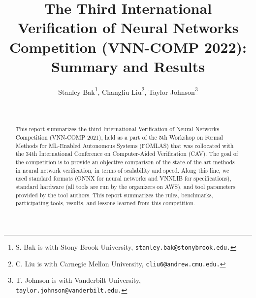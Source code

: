 \documentclass{easychair}
\title{The Third International Verification of Neural Networks Competition (VNN-COMP 2022): Summary and Results%
}
\author{Stanley Bak\thanks{S. Bak is with Stony Brook University, \tt stanley.bak@stonybrook.edu.}, Changliu Liu\thanks{C. Liu is with Carnegie Mellon University, \tt cliu6@andrew.cmu.edu.}, Taylor Johnson\thanks{T. Johnson is with Vanderbilt University, \tt taylor.johnson@vanderbilt.edu.}
}
\institute{
 }
\date{\phantom{date}\\}
\begin{document}
\maketitle

\begin{abstract}
This report summarizes the third International Verification of Neural Networks Competition (VNN-COMP 2021), held as a part of the 5th Workshop on Formal Methods for ML-Enabled Autonomous Systems (FOMLAS) that was collocated with the 34th International Conference on Computer-Aided Verification (CAV).
%
%
The goal of the competition is to provide an objective comparison of the state-of-the-art methods in neural network verification, in terms of scalability and speed.
%
Along this line, we used standard formats (ONNX for neural networks and VNNLIB for specifications), standard hardware (all tools are run by the organizers on AWS), and tool parameters provided by the tool authors.
%
This report summarizes the rules, benchmarks, participating tools, results, and lessons learned from this competition.
\end{abstract}





%

%

%

%

%

%

%


%
%
%
%
%




\end{document}
